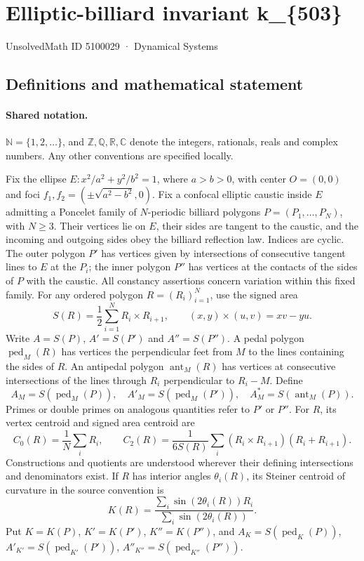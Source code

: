 \documentclass[11pt]{article}
\begin{document}
\setcounter{section}{5100028}
\section{Elliptic-billiard invariant k\_\{503\}}\label{5100029}
{\small\sffamily UnsolvedMath ID 5100029 · Dynamical Systems}
\subsection{Definitions and mathematical statement}

\paragraph{Shared notation.}$\mathbb N=\{1,2,\ldots\}$, and $\mathbb Z,\mathbb Q,\mathbb R,\mathbb C$ denote the integers, rationals, reals and complex numbers. Any other conventions are specified locally.


Fix the ellipse $E:x^2/a^2+y^2/b^2=1$, where $a>b>0$, with center $O=(0,0)$ and foci $f_1,f_2=(\pm\sqrt{a^2-b^2},0)$. Fix a confocal elliptic caustic inside $E$ admitting a Poncelet family of $N$-periodic billiard polygons $P=(P_1,\ldots,P_N)$, with $N\geq3$. Their vertices lie on $E$, their sides are tangent to the caustic, and the incoming and outgoing sides obey the billiard reflection law. Indices are cyclic. The outer polygon $P'$ has vertices given by intersections of consecutive tangent lines to $E$ at the $P_i$; the inner polygon $P''$ has vertices at the contacts of the sides of $P$ with the caustic. All constancy assertions concern variation within this fixed family.
For any ordered polygon $R=(R_i)_{i=1}^N$, use the signed area
\[S(R)=\frac12\sum_{i=1}^N R_i\times R_{i+1},\qquad (x,y)\times(u,v)=xv-yu.\]
Write $A=S(P)$, $A'=S(P')$ and $A''=S(P'')$. A pedal polygon $\operatorname{ped}_M(R)$ has vertices the perpendicular feet from $M$ to the lines containing the sides of $R$. An antipedal polygon $\operatorname{ant}_M(R)$ has vertices at consecutive intersections of the lines through $R_i$ perpendicular to $R_i-M$. Define
\[A_M=S(\operatorname{ped}_M(P)),\quad A'_M=S(\operatorname{ped}_M(P')),\quad A_M^*=S(\operatorname{ant}_M(P)).\]
Primes or double primes on analogous quantities refer to $P'$ or $P''$. For $R$, its vertex centroid and signed area centroid are
\[C_0(R)=\frac1N\sum_i R_i,\qquad C_2(R)=\frac{1}{6S(R)}\sum_i(R_i\times R_{i+1})(R_i+R_{i+1}).\]
Constructions and quotients are understood wherever their defining intersections and denominators exist.
If $R$ has interior angles $\theta_i(R)$, its Steiner centroid of curvature in the source convention is
\[K(R)=\frac{\sum_i\sin(2\theta_i(R))R_i}{\sum_i\sin(2\theta_i(R))}.\]
Put $K=K(P)$, $K'=K(P')$, $K''=K(P'')$, and $A_K=S(\operatorname{ped}_K(P))$, $A'_{K'}=S(\operatorname{ped}_{K'}(P'))$, $A''_{K''}=S(\operatorname{ped}_{K''}(P''))$.
\end{document}
